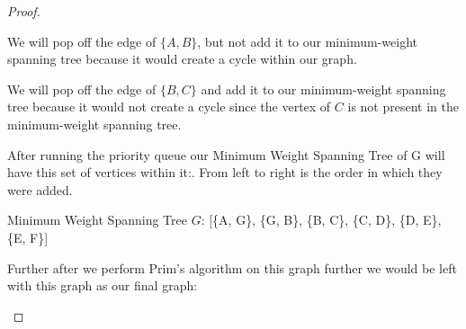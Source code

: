 \documentclass[11pt]{article}
\theoremstyle{definition}
\theoremstyle{definition}
\theoremstyle{definition}
\begin{document}
\begin{proof}
\begin{center}
We will pop off the edge of $\{A, B\}$, but not add it to our minimum-weight spanning tree because it would create a cycle within our graph.
\end{center}

\begin{center}
We will pop off the edge of $\{B, C\}$ and add it to our minimum-weight spanning tree because it would not create a cycle since the vertex of $C$ is not present in the minimum-weight spanning tree.
\end{center}

After running the priority queue our Minimum Weight Spanning Tree of G will have this set of vertices within it:. From left to right is the order in which they were added.\\
\begin{center}
Minimum Weight Spanning Tree $G$: [\{A, G\}, \{G, B\}, \{B, C\}, \{C, D\}, \{D, E\}, \{E, F\}]
\end{center}
Further after we perform Prim's algorithm on this graph further we would be left with this graph as our final graph: \\
\begin {center}
\end{center}

\end{proof}





\newpage
\end{document}
